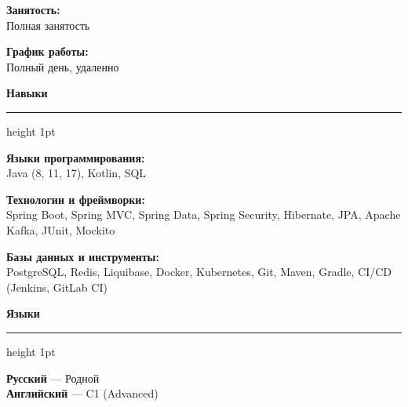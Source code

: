 \documentclass[10pt,a4paper]{article}
\begin{document}
\begin{minipage}[t]{0.28\textwidth}
  \vspace{6pt}
  \textbf{Занятость:} \\
  Полная занятость

  \vspace{6pt}
  \textbf{График работы:} \\
  Полный день, удаленно

  \vspace{14pt}

  {\color{accentcolor}\large\bfseries Навыки}
  \vspace{2pt}
  {\color{dividercolor}\hrule height 1pt}
  \vspace{6pt}

  \textbf{Языки программирования:} \\
  Java (8, 11, 17), Kotlin, SQL

  \vspace{6pt}
  \textbf{Технологии и фреймворки:} \\
  Spring Boot, Spring MVC, Spring Data, Spring Security, Hibernate, JPA, Apache Kafka, JUnit, Mockito

  \vspace{6pt}
  \textbf{Базы данных и инструменты:} \\
  PostgreSQL, Redis, Liquibase, Docker, Kubernetes, Git, Maven, Gradle, CI/CD (Jenkins, GitLab CI)

  \vspace{14pt}

  {\color{accentcolor}\large\bfseries Языки}
  \vspace{2pt}
  {\color{dividercolor}\hrule height 1pt}
  \vspace{6pt}

  \textbf{Русский} — Родной \\
  \textbf{Английский} — C1 (Advanced)
\end{minipage}%
\hfill
\end{document}
